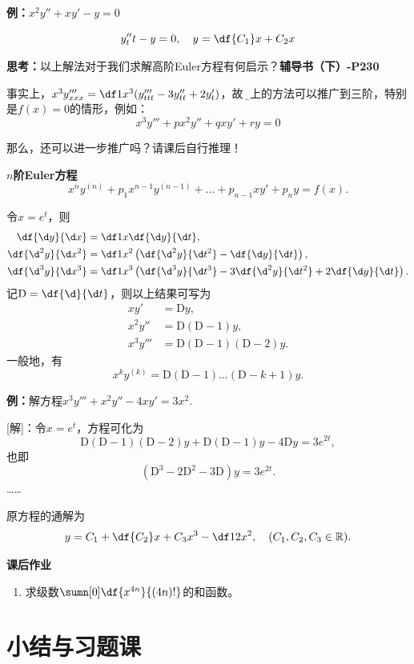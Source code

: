 {\bf 例：}$x^2y''+xy'-y=0$

$$y''_tt-y=0,\quad y=\df{C_1}x+C_2x$$

{\bf 思考：}以上解法对于我们求解高阶Euler方程有何启示？\hfill{\bf 辅导书（下）-P230}

事实上，$x^3y'''_{xxx}=\df1{x^3}(y'''_{ttt}-3y''_{tt}+2y'_t)$，故
{\b 以上的方法可以推广到三阶}，特别是$f(x)=0$的情形，例如：
$$x^3y'''+px^2y''+qxy'+ry=0$$

那么，还可以进一步推广吗？请课后自行推理！

\begin{shaded}
	{\bf $n$阶Euler方程}
	$$x^ny^{(n)}+p_1x^{n-1}y^{(n-1)}+\ldots+p_{n-1}xy'
	+p_ny=f(x).$$
	
	令$x=e^t$，则
	\begin{align*}
		\df{\d y}{\d x}&=\df1x\df{\d y}{\d t},\\
		\df{\d^2 y}{\d x^2}&=\df1{x^2}\left(\df{\d^2 y}{\d t^2}
		-\df{\d y}{\d t}\right),\\
		\df{\d^3 y}{\d x^3}&=\df1{x^3}\left(\df{\d^3 y}{\d t^3}
		-3\df{\d^2 y}{\d t^2}+2\df{\d y}{\d t}\right).
	\end{align*}
	记$\mathrm{D}=\df{\d}{\d t}$，则以上结果可写为
	\begin{align*}
		xy'&=\mathrm{D}y,\\
		x^2y''&=\mathrm{D}(\mathrm{D}-1)y,\\
		x^3y'''&=\mathrm{D}(\mathrm{D}-1)(\mathrm{D}-2)y.
	\end{align*}
	一般地，有
	$$x^ky^{(k)}=\mathrm{D}(\mathrm{D}-1)\ldots(\mathrm{D}-k+1)y.$$
	
	{\bf 例：}解方程$x^3y'''+x^2y''-4xy'=3x^2$.
	
	[解]：令$x=e^t$，方程可化为
	$$\mathrm{D}(\mathrm{D}-1)(\mathrm{D}-2)y+\mathrm{D}(\mathrm{D}-1)y
	-4\mathrm{D}y=3e^{2t},$$
	也即
	$$(\mathrm{D}^3-2\mathrm{D}^2-3\mathrm{D})y=3e^{2t}.$$
	\ldots\ldots
	
	原方程的通解为
	$$y=C_1+\df{C_2}x+C_3x^3-\df12x^2,\quad(C_1,C_2,C_3\in\mathbb{R}).$$
\end{shaded}

\begin{ext}
	{\bf 课后作业}
	\begin{enumerate}
	  \item 求级数$\sumn[0]\df{x^{4n}}{(4n)!}$的和函数。
	\end{enumerate}
\end{ext}

\section{小结与习题课}

